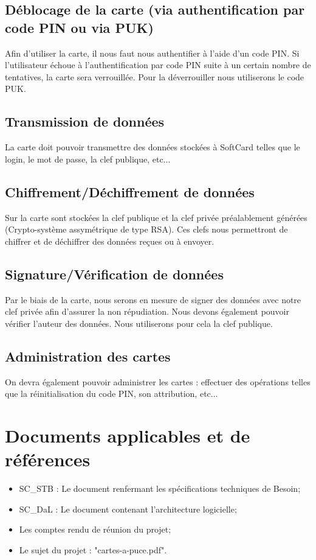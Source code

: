\documentclass[a4paper,11pt,french]{article}
\begin{document}
\subsection*{Déblocage de la carte (via authentification par code PIN ou via PUK)}
Afin d'utiliser la carte, il nous faut nous authentifier à l'aide d'un code PIN.
Si l'utilisateur échoue à l'authentification par code PIN suite à un certain
nombre de tentatives, la carte sera verrouillée. Pour la déverrouiller nous
utiliserons le code PUK.

\subsection*{Transmission de données}
La carte doit pouvoir transmettre des données stockées à SoftCard telles que
le login, le mot de passe, la clef publique, etc...

\subsection*{Chiffrement/Déchiffrement de données}
Sur la carte sont stockées la clef publique et la clef privée préalablement
générées (Crypto-système assymétrique de type RSA). Ces clefs nous
permettront de chiffrer et de déchiffrer des données reçues ou à envoyer.

\subsection*{Signature/Vérification de données}
Par le biais de la carte, nous serons en mesure de signer des données avec
notre clef privée afin d'assurer la non répudiation. Nous devons également
pouvoir vérifier l'auteur des données. Nous utiliserons pour cela la clef
publique. 

\subsection*{Administration des cartes}
On devra également pouvoir administrer les cartes : effectuer des opérations
telles que la réinitialisation du code PIN, son attribution, etc...


\section{Documents applicables et de références}
\begin{itemize}
	\item SC\_STB : Le document renfermant les spécifications techniques de Besoin;
	\item SC\_DaL : Le document contenant l'architecture logicielle;
	\item Les comptes rendu de réunion du projet;
	\item Le sujet du projet : "cartes-a-puce.pdf".
\end{itemize}
\end{document}
